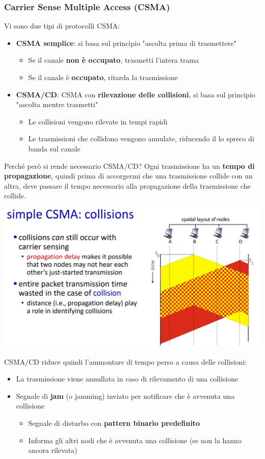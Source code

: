 \documentclass[12pt]{article}
\begin{document}
\subsubsection{Carrier Sense Multiple Access (CSMA)}
Vi sono due tipi di protocolli CSMA:
\begin{itemize}
    \item \textbf{CSMA semplice}: si basa sul principio "ascolta prima di trasmettere"
    \begin{itemize}
        \item Se il canale \textbf{non è occupato}, trasmetti l'intera trama
        \item Se il canale è \textbf{occupato}, ritarda la trasmissione
    \end{itemize}
    \item \textbf{CSMA/CD}: CSMA con \textbf{rilevazione delle collisioni}, si basa sul principio "ascolta mentre trasmetti"
    \begin{itemize}
        \item Le collisioni vengono rilevate in tempi rapidi
        \item Le trasmissioni che collidono vengono annulate, riducendo il lo spreco di banda sul canale
    \end{itemize}
\end{itemize}
Perché però si rende necessario CSMA/CD? Ogni trasmissione ha un \textbf{tempo di propagazione}, quindi prima di accorgermi che una
trasmissione collide con un altra, deve passare il tempo necessario alla propagazione della trasmissione che collide.
\begin{center}
    \includegraphics[width =1\linewidth]{Images/122.png}
\end{center}
CSMA/CD riduce quindi l'ammontare di tempo perso a causa delle collisioni:
\begin{itemize}
    \item La trasmissione viene annullata in caso di rilevamento di una collisione
    \item Segnale di \textbf{jam} (o jamming) inviato per notificare che è avvenuta una collisione
    \begin{itemize}
        \item Segnale di disturbo con \textbf{pattern binario predefinito}
        \item Informa gli altri nodi che è avvenuta una collisione (se non la hanno ancora rilevata)
    \end{itemize}
\end{itemize}
\end{document}
